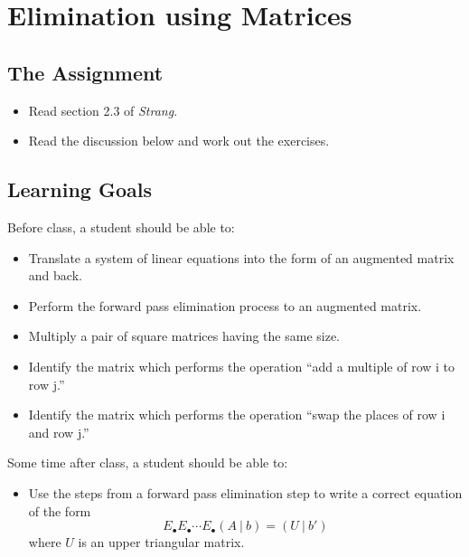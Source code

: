\documentclass[10pt,]{book}
\theoremstyle{plain}
\numberwithin{equation}{section}
\begin{document}
\section[Elimination using Matrices]{Elimination using Matrices}\label{matrix-elimination}
\typeout{************************************************}
\typeout{************************************************}
\subsection[The Assignment]{The Assignment}\label{subsection-29}
\begin{itemize}
\item{}Read section 2.3 of \emph{Strang}.\item{}Read the discussion below and work out the exercises.\end{itemize}
\typeout{************************************************}
\typeout{************************************************}
\subsection[Learning Goals]{Learning Goals}\label{subsection-30}

        Before class, a student should be able to:
\begin{itemize}
\item{}
          Translate a system of linear equations into the form of an augmented matrix
          and back.
        \item{}
          Perform the forward pass elimination process to an augmented matrix.
        \item{}
          Multiply a pair of square matrices having the same size.
        \item{}
          Identify the matrix which performs the operation ``add a multiple of row
          i to row j.''
        \item{}Identify the matrix which performs the operation ``swap the places of
          row i and row j.''
        \end{itemize}
\par

        Some time after class, a student should be able to:
\begin{itemize}
\item{}
          Use the steps from a forward pass elimination step to write a correct
          equation of the form
          \[
            E_{\bullet}E_{\bullet}\cdots E_{\bullet} (A\ |\ b) = (U\ |\ b')
          \]
          where \(U\) is an upper triangular matrix.
        \end{itemize}
\typeout{************************************************}
\typeout{************************************************}
\end{document}
